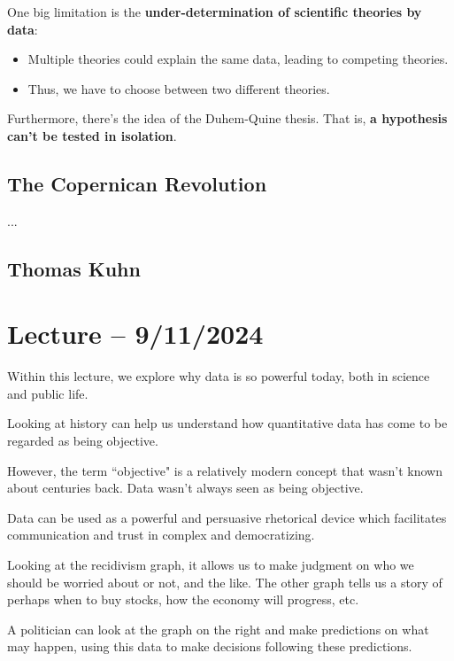 \documentclass[openany]{book}
\begin{document}
One big limitation is the \textbf{under-determination of scientific theories by data}:
\begin{itemize}
	\item Multiple theories could explain the same data, leading to competing theories.
	\item Thus, we have to choose between two different theories.
\end{itemize}

Furthermore, there's the idea of the Duhem-Quine thesis. That is, \textbf{a hypothesis can't be tested in isolation}.

\subsection{The Copernican Revolution}
...

\subsection{Thomas Kuhn}

\section{Lecture -- 9/11/2024}
Within this lecture, we explore why data is so powerful today, both in science and public life.

Looking at history can help us understand how quantitative data has come to be regarded as being objective.

However, the term ``objective" is a relatively modern concept that wasn't known about centuries back. Data wasn't always seen as being objective.

\begin{rmk}
	Data can be used as a powerful and persuasive rhetorical device which facilitates communication and trust in complex and democratizing.
\end{rmk}


Looking at the recidivism graph, it allows us to make judgment on who we should be worried about or not, and the like. The other graph tells us a story of perhaps when to buy stocks, how the economy will progress, etc.

A politician can look at the graph on the right and make predictions on what may happen, using this data to make decisions following these predictions.
\end{document}
